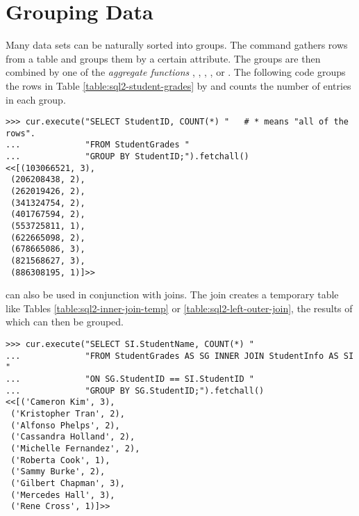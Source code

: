 \section*{Grouping Data} %


Many data sets can be naturally sorted into groups.
The  command gathers rows from a table and groups them by a certain attribute.
The groups are then combined by one of the \emph{aggregate functions} , , , , or .
The following code groups the rows in Table \ref{table:sql2-student-grades} by  and counts the number of entries in each group.

\begin{lstlisting}
>>> cur.execute("SELECT StudentID, COUNT(*) "   # * means "all of the rows".
...             "FROM StudentGrades "
...             "GROUP BY StudentID;").fetchall()
<<[(103066521, 3),
 (206208438, 2),
 (262019426, 2),
 (341324754, 2),
 (401767594, 2),
 (553725811, 1),
 (622665098, 2),
 (678665086, 3),
 (821568627, 3),
 (886308195, 1)]>>
\end{lstlisting}

 can also be used in conjunction with joins.
The join creates a temporary table like Tables \ref{table:sql2-inner-join-temp} or \ref{table:sql2-left-outer-join}, the results of which can then be grouped.

\begin{lstlisting}
>>> cur.execute("SELECT SI.StudentName, COUNT(*) "
...             "FROM StudentGrades AS SG INNER JOIN StudentInfo AS SI "
...             "ON SG.StudentID == SI.StudentID "
...             "GROUP BY SG.StudentID;").fetchall()
<<[('Cameron Kim', 3),
 ('Kristopher Tran', 2),
 ('Alfonso Phelps', 2),
 ('Cassandra Holland', 2),
 ('Michelle Fernandez', 2),
 ('Roberta Cook', 1),
 ('Sammy Burke', 2),
 ('Gilbert Chapman', 3),
 ('Mercedes Hall', 3),
 ('Rene Cross', 1)]>>
\end{lstlisting}

